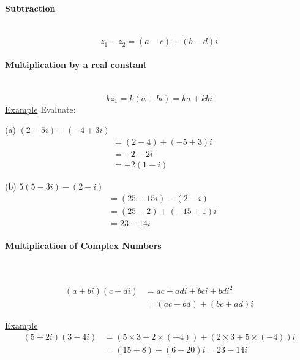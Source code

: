 \documentclass[a4paper]{article}
\begin{document}
				\paragraph{Subtraction}\mbox{}\\
					\[
						z_1-z_2=(a-c)+(b-d)i
					\]
				\paragraph{Multiplication by a real constant}\mbox{}\\
					\[
						kz_1=k(a+bi)=ka+kbi
					\]
				\underline{Example}\newline
				Evaluate:\newline
				\begin{minipage}[t]{0.5\textwidth}
					(a) $(2-5i)+(-4+3i)$
					\begin{align*}
						&=(2-4)+(-5+3)i \\
						&=-2-2i \\
						&=-2(1-i)
					\end{align*}
				\end{minipage}
				\hfill
				\begin{minipage}[t]{0.5\textwidth}
					(b) $5(5-3i)-(2-i)$
					\begin{align*}
						&=(25-15i)-(2-i) \\
						&=(25-2)+(-15+1)i \\
						&=23-14i
					\end{align*}
				\end{minipage}
				\paragraph{Multiplication of Complex Numbers}\mbox{}\\
					\begin{minipage}[t]{0.2\textwidth}
						\begin{align*}
							(a+bi)(c+di)&=ac+adi+bci+bdi^2 \\
							&=(ac-bd)+(bc+ad)i
						\end{align*}
					\end{minipage}
					\hfill
					\begin{minipage}[t]{0.5\textwidth}
						\underline{Example}
						\begin{align*}
							(5+2i)(3-4i)&=(5\times3-2\times(-4))+(2\times3+5\times(-4))i \\
							&=(15+8)+(6-20)i=23-14i
						\end{align*}
					\end{minipage}
\end{document}
